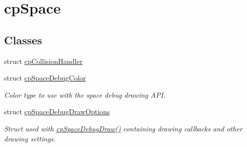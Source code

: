 \hypertarget{group__cp_space}{}\section{cp\+Space}
\label{group__cp_space}
\subsection*{Classes}
\begin{DoxyCompactItemize}
\item 
struct \mbox{\hyperlink{structcp_collision_handler}{cp\+Collision\+Handler}}
\item 
struct \mbox{\hyperlink{structcp_space_debug_color}{cp\+Space\+Debug\+Color}}
\begin{DoxyCompactList}\small\item\em Color type to use with the space debug drawing A\+PI. \end{DoxyCompactList}\item 
struct \mbox{\hyperlink{structcp_space_debug_draw_options}{cp\+Space\+Debug\+Draw\+Options}}
\begin{DoxyCompactList}\small\item\em Struct used with \mbox{\hyperlink{group__cp_space_ga02e8a34681aff3f29bd976e830f3b6da}{cp\+Space\+Debug\+Draw()}} containing drawing callbacks and other drawing settings. \end{DoxyCompactList}\end{DoxyCompactItemize}
